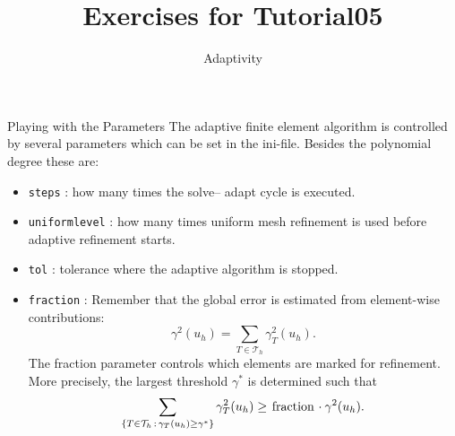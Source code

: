 \documentclass[12pt,a4paper]{article}
\title{\textbf{Exercises for Tutorial05}}
\subtitle{Adaptivity}
\begin{document}
\exerciseheader

\begin{Exercise}{Playing with the Parameters}
  The adaptive finite element algorithm is controlled by several
  parameters which can be set in the ini-file.  Besides the polynomial
  degree these are:
  \begin{itemize}
  \item \lstinline{steps} : how many times the solve-- adapt cycle is
    executed.
  \item \lstinline{uniformlevel} : how many times uniform mesh
    refinement is used before adaptive refinement starts.
  \item \lstinline{tol} : tolerance where the adaptive algorithm is
    stopped.
  \item \lstinline{fraction} : Remember that the global error is
    estimated from element-wise contributions:
    $$\gamma^2(u_h) = \sum_{T\in \mathcal{T}_h} \gamma_T^2(u_h).$$ The
    fraction parameter controls which elements are marked for
    refinement. More precisely, the largest threshold $\gamma^\ast$ is
    determined such that
    $$\sum_{\{T\in\mathcal{T}_h \,:\, \gamma_T(u_h)\geq\gamma^\ast\}}
    \gamma_T^2(u_h) \geq \text{\lstinline{fraction}} \cdot
    \gamma^2(u_h). $$


\end{itemize}
\end{Exercise}
\end{document}
